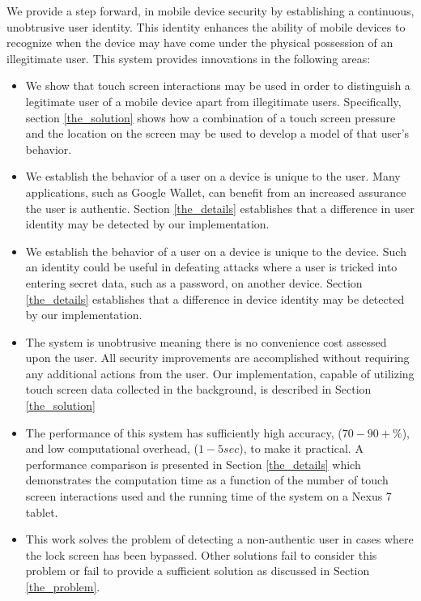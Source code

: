 We provide a step forward, 
%
in mobile device security by
establishing a continuous, unobtrusive user identity.
%
This identity
enhances the ability of mobile devices to
recognize when the 
device may have come under
the physical possession of an illegitimate user.
%
This system provides innovations in the following areas:
\begin{itemize}
\item We show that touch screen interactions may be used in order to
  distinguish a legitimate user of a mobile device apart from
  illegitimate users.
  Specifically, section
  \ref{the_solution} %
  shows how a combination of 
  a touch screen pressure and 
  the location on the screen
  may be used to develop a model of that user's behavior.
\item We establish the behavior of a user on a device
  is unique to the user.
  Many applications, such as Google Wallet,
  can benefit from an increased
  assurance the user is authentic.
  Section 
  \ref{the_details} %
  establishes that a difference in user identity
  may be detected by our implementation.
\item We establish the behavior of a user on a device
  is unique to the device.
  Such an identity could be useful in defeating
  attacks where a user is tricked into entering
  secret data, such as a password,
  on another device.
  Section 
  \ref{the_details} %
  establishes that a difference in device identity
  may be detected by our implementation.
\item The system is unobtrusive meaning there is no convenience cost assessed upon the user.
  All security improvements are accomplished without requiring any additional
  actions from the user.
  Our implementation,
  capable of utilizing touch screen data collected in the background, 
  is described in
  Section
  \ref{the_solution} %
\item The performance of this system 
  has sufficiently high accuracy, ($70-90+\%$), and
  low computational overhead, ($1-5 sec$),
  to make it practical.
  A performance comparison is presented in Section
  \ref{the_details} %
  which demonstrates 
  the computation time as a function of
  the number of touch screen interactions used and
  the running time of the system on a Nexus 7 tablet.
\item This work solves the problem of
  detecting a non-authentic user
  in cases where the lock screen has been bypassed. %
  Other solutions fail to consider this problem
  or fail to provide a sufficient solution
  as discussed in Section
  \ref{the_problem}.
\end{itemize}

